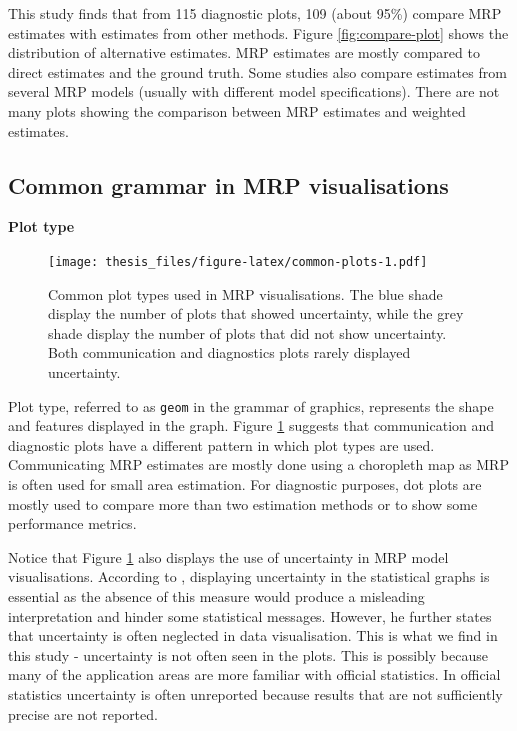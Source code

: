 \documentclass{monashthesis}
\begin{document}
This study finds that from 115 diagnostic plots, 109 (about 95\%) compare MRP estimates with estimates from other methods. Figure \ref{fig:compare-plot} shows the distribution of alternative estimates. MRP estimates are mostly compared to direct estimates and the ground truth. Some studies also compare estimates from several MRP models (usually with different model specifications). There are not many plots showing the comparison between MRP estimates and weighted estimates.

\hypertarget{common-grammar-in-mrp-visualisations}{%
\subsection{Common grammar in MRP visualisations}\label{common-grammar-in-mrp-visualisations}}

\textbf{Plot type}

\begin{figure}
\centering
\texttt{[image: thesis\_files/figure-latex/common-plots-1.pdf]}
\caption{\label{fig:common-plots}Common plot types used in MRP visualisations. The blue shade display the number of plots that showed uncertainty, while the grey shade display the number of plots that did not show uncertainty. Both communication and diagnostics plots rarely displayed uncertainty.}
\end{figure}

Plot type, referred to as \texttt{geom} in the grammar of graphics, represents the shape and features displayed in the graph. Figure \ref{fig:common-plots} suggests that communication and diagnostic plots have a different pattern in which plot types are used. Communicating MRP estimates are mostly done using a choropleth map as MRP is often used for small area estimation. For diagnostic purposes, dot plots are mostly used to compare more than two estimation methods or to show some performance metrics.

Notice that Figure \ref{fig:common-plots} also displays the use of uncertainty in MRP model visualisations. According to \textcite{MIDWAY2020100141}, displaying uncertainty in the statistical graphs is essential as the absence of this measure would produce a misleading interpretation and hinder some statistical messages. However, he further states that uncertainty is often neglected in data visualisation. This is what we find in this study - uncertainty is not often seen in the plots. This is possibly because many of the application areas are more familiar with official statistics. In official statistics uncertainty is often unreported because results that are not sufficiently precise are not reported.
\end{document}
